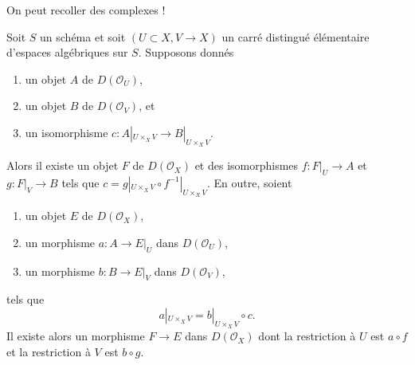\noindent
On peut recoller des complexes !

\begin{lemma}
\label{lemma-glue}
Soit $S$ un sch\'ema et soit $(U \subset X, V \to X)$ un carr\'e distingu\'e
\'el\'ementaire d'espaces alg\'ebriques sur $S$. Supposons donn\'es
\begin{enumerate}
\item un objet $A$ de $D(\mathcal{O}_U)$,
\item un objet $B$ de $D(\mathcal{O}_V)$, et
\item un isomorphisme $c : A|_{U \times_X V} \to B|_{U \times_X V}$.
\end{enumerate}
Alors il existe un objet $F$ de $D(\mathcal{O}_X)$ et des isomorphismes
$f : F|_U \to A$ et $g : F|_V \to B$ tels que
$c = g|_{U \times_X V} \circ f^{-1}|_{U \times_X V}$. En outre, soient
\begin{enumerate}
\item un objet $E$ de $D(\mathcal{O}_X)$,
\item un morphisme $a : A \to E|_U$ dans $D(\mathcal{O}_U)$,
\item un morphisme $b : B \to E|_V$ dans $D(\mathcal{O}_V)$,
\end{enumerate}
tels que
$$
a|_{U \times_X V}  = b|_{U \times_X V} \circ c.
$$
Il existe alors un morphisme $F \to E$ dans $D(\mathcal{O}_X)$ dont la
restriction \`a $U$ est $a \circ f$ et la restriction \`a $V$ est
$b \circ g$.
\end{lemma}

